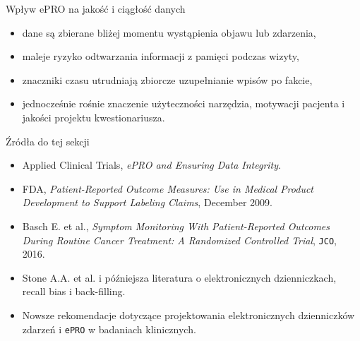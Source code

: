 \begin{frame}{Wpływ ePRO na jakość i ciągłość danych}
  \begin{itemize}
    \item dane są zbierane bliżej momentu wystąpienia objawu lub zdarzenia,
    \item maleje ryzyko odtwarzania informacji z pamięci podczas wizyty,
    \item znaczniki czasu utrudniają zbiorcze uzupełnianie wpisów po fakcie,
    \item jednocześnie rośnie znaczenie użyteczności narzędzia, motywacji pacjenta i jakości projektu kwestionariusza.
  \end{itemize}
\end{frame}


\begin{frame}{Źródła do tej sekcji}
  \footnotesize
  \begin{itemize}
    \item Applied Clinical Trials, \textit{ePRO and Ensuring Data Integrity}.
    \item FDA, \textit{Patient-Reported Outcome Measures: Use in Medical Product Development to Support Labeling Claims}, December 2009.
    \item Basch E. et al., \textit{Symptom Monitoring With Patient-Reported Outcomes During Routine Cancer Treatment: A Randomized Controlled Trial}, \texttt{JCO}, 2016.
    \item Stone A.A. et al. i późniejsza literatura o elektronicznych dzienniczkach, recall bias i back-filling.
    \item Nowsze rekomendacje dotyczące projektowania elektronicznych dzienniczków zdarzeń i \texttt{ePRO} w badaniach klinicznych.
  \end{itemize}
\end{frame}
